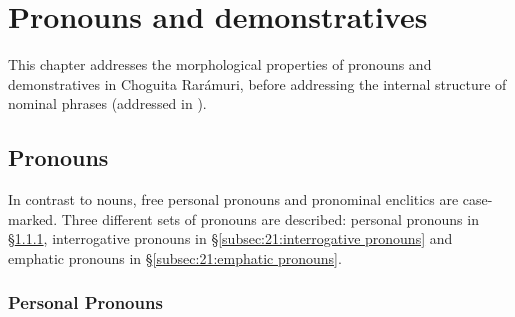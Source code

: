 \chapter{Pronouns and demonstratives}
\label{chap: pronouns and demonstratives}


This chapter addresses the morphological properties of pronouns and demonstratives in Choguita Rarámuri, before addressing the internal structure of nominal phrases (addressed in ).

\section{Pronouns}
\label{sec:21:pronouns}

In contrast to nouns, free personal pronouns and pronominal enclitics are case-marked. Three different sets of pronouns are described: personal pronouns in §\ref{subsec:21:personal pronouns}, interrogative pronouns in §\ref{subsec:21:interrogative pronouns} and emphatic pronouns in §\ref{subsec:21:emphatic pronouns}.

\subsection{Personal Pronouns}
\label{subsec:21:personal pronouns}

